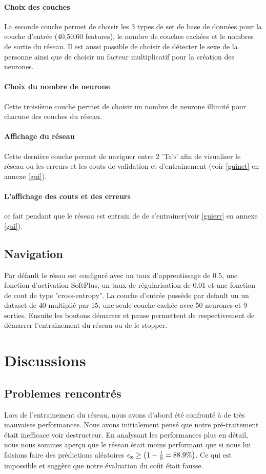 \documentclass[11pt]{article}
\begin{document}
\paragraph{Choix des couches} La seconde couche permet de choisir les 3 types
de set de base de donn\'ees pour la couche d'entr\'ee (40,50,60 features), le
nombre de couches cach\'ees et le nombres de sortie du r\'eseau. Il est aussi
possible de choisir de d\'etecter le sexe de la personne ainsi que de choisir
un facteur multiplicatif pour la cr\'eation des neurones.

\paragraph{Choix du nombre de neurone} Cette troisi\`eme couche permet de
choisir un nombre de neurone illimit\'e pour chacune des couches du r\'eseau.

\paragraph{Affichage du r\'eseau} Cette derni\`ere couche permet de naviguer
entre 2 'Tab' afin de visualiser le r\'eseau ou les erreurs et les couts de
validation et d'entrainement (voir \ref{guinet} en annexe \ref{gui}).
\paragraph{L'affichage des couts et des erreurs} ce fait pendant que le
r\'eseau est entrain de de s'entrainer(voir \ref{guierr} en annexe \ref{gui}).

\subsection{Navigation}
Par d\'efault le r\'esau est configur\'e avec un taux d'apprentissage de 0.5,
une fonction d'activation SoftPlus, un taux de r\'egularisation de 0.01 et une
fonction de cout de type "cross-entropy". La couche d'entr\'ee poss\`ede par
default un un dataset de 40 multipli\'e par 15, une seule couche cach\'ee avec
50 neurones et 9 sorties. Ensuite les boutons d\'emarrer et pause permettent
de respectivement de d\'emarrer l'entrainement du r\'eseau ou de le stopper.



\section{Discussions}
\subsection{Problemes rencontr\'es}
Lors de l'entrainement du r\'eseau, nous avons d'abord \'et\'e confront\'e \`a
de tr\`es mauvaises performances. Nous avons initialement pens\'e que notre
pr\'e-traitement \'etait inefficace voir destructeur. En analysant les
performances plus en d\'etail,
nous nous sommes aper\c cu que le r\'eseau \'etait moins performant que si
nous lui faisions faire des pr\'edictions al\'eatoires
$\epsilon_{\bf x} \ge \left (1 - \frac{1}{9} = 88.9\% \right)$.
Ce qui est impossible et sugg\`ere que notre \'evaluation du co\^ut \'etait fausse.
\end{document}

